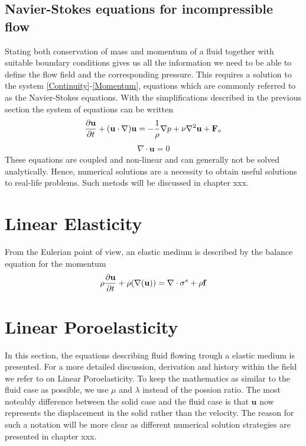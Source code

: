 \subsection{Navier-Stokes equations for incompressible flow}
Stating both conservation of mass and momentum of a fluid together with suitable boundary conditions gives us all the information we need to be able to define the flow field and the corresponding pressure. This requires a solution to the system \eqref{Continuity}-\eqref{Momentum}, equations which are commonly referred to as the Navier-Stokes equations. With the simplifications described in the previous section the system of equations can be written
\begin{align}
\frac{\partial \mathbf{u}}{\partial t} + (\mathbf{u} \cdot \nabla) \mathbf{u} = -\frac{1}{\rho}\nabla p + \nu\nabla^2 \mathbf{u} + \mathbf{F}_v \label{Navier}
\end{align}
\begin{align}
\nabla \cdot \mathbf{u} = 0 \label{Stokes}
\end{align}
These equations are coupled and non-linear and can generally not be solved analytically. Hence, numerical solutions are a necessity to obtain useful solutions to real-life problems. Such metods will be discussed in chapter xxx. 


\section{Linear Elasticity}
From the Eulerian point of view, an elastic medium is described by the balance equation for the momentum 
\begin{align} \rho \frac{\partial \mathbf{u}}{\partial t} + \rho(\nabla(\mathbf{u})) = \nabla \cdot \mathbf{\sigma}^s + \rho\mathbf{f} \label{LE}
\end{align}


\section{Linear Poroelasticity}
In this section, the equations describing fluid flowing trough a elastic medium is presented. For a more detailed discussion, derivation and history within the field we refer to \cite{Wang} on Linear Poroelasticity. To keep the mathematics as similar to the fluid case as possible, we use $\mu$ and $\lambda$ instead of the possion ratio. The most noteably difference between the solid case and the fluid case is that $\mathbf{u}$ now represents the displacement in the solid rather than the velocity. The reason for such a notation will be more clear as different numerical solution strategies are presented in chapter xxx.
\\
\\

